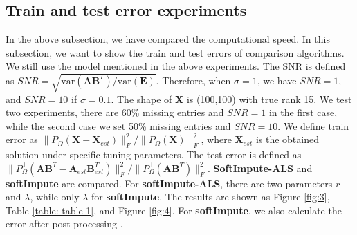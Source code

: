 \documentclass[11pt]{article}
\begin{document}
\subsection{Train and test error experiments}
	In the above subsection, we have compared the computational speed. In this subsection, we want to show the train and test errors of comparison algorithms. We still use the model mentioned in the above experiments. 
The SNR is defined as $SNR=\sqrt{\mathrm{var}(\boldsymbol{A}\boldsymbol{B}^T)/\mathrm{var}(\boldsymbol{E})}$. Therefore, when $\sigma=1$, we have $SNR=1$, and $SNR=10$ if $\sigma=0.1$.  The shape of $\boldsymbol{X}$ is (100,100) with true rank 15. We test two experiments, there are 60\% missing entries and $SNR=1$ in the first case, while the second case we set 50\% missing entries and $SNR=10$. We define train error as $\|P_{\Omega}(\boldsymbol{X}-\boldsymbol{X}_{est})\|_F^2/\|P_{\Omega}(\boldsymbol{X})\|_F^2$, where $\boldsymbol{X}_{est}$ is the obtained solution under specific tuning parameters. The test error is defined as $\|P_{\Omega}^{\perp}(\boldsymbol{A}\boldsymbol{B}^T-\boldsymbol{A}_{est}\boldsymbol{B}_{est}^T)\|_F^2/\|P_{\Omega}^{\perp}(\boldsymbol{A}\boldsymbol{B}^T)\|_F^2$. \textbf{SoftImpute-ALS} and \textbf{softImpute} are compared. For \textbf{softImpute-ALS}, there are two parameters $r$  and $\lambda$, while only $\lambda$ for \textbf{softImpute}. The results are shown as Figure \ref{fig:3}, Table \ref{table: table 1}, and  Figure \ref{fig:4}. For \textbf{softImpute}, we also calculate the error after post-processing \citep[][Sec. 7]{mazumder2010spectral}.
\end{document}
